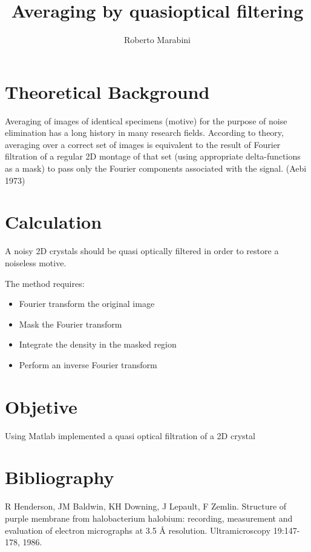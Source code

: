 \documentclass[a4paper,10pt]{article}
\title{Averaging by quasioptical filtering}
\author{Roberto Marabini}
\date{}
\begin{document}
\maketitle

\section{Theoretical Background}

Averaging of images of identical specimens (motive) for the purpose of noise elimination 
has a long history in many research fields. According to theory, averaging
over a correct set of images is equivalent to the result of Fourier filtration
of a regular 2D montage of that set (using appropriate delta-functions as a mask)
to pass only the Fourier components associated with the signal. (Aebi 1973)



\section {Calculation}

A noisy 2D crystals should be quasi optically filtered in order to restore 
a noiseless motive.

The method requires:
\begin{itemize}
 \item Fourier transform the original image
 \item Mask the Fourier transform 
 \item Integrate the density in the masked region
 \item Perform an inverse Fourier transform

\end{itemize}

\section {Objetive}
Using Matlab implemented a quasi optical filtration of a 2D crystal

\section {Bibliography}
R Henderson, JM Baldwin, KH Downing, J Lepault, F Zemlin. Structure of purple membrane from halobacterium halobium: recording, measurement and evaluation of electron micrographs at 3.5 Å resolution. Ultramicroscopy 19:147-178, 1986.
\end{document}
